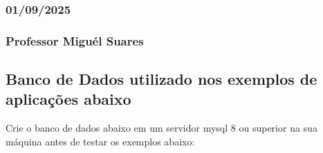 \documentclass[
]{book}
\begin{document}
\subsubsection*{01/09/2025}\label{section-12}

\subsubsection*{Professor Miguél Suares}\label{professor-miguuxe9l-suares-12}

\subsection{Banco de Dados utilizado nos exemplos de aplicações abaixo}\label{banco-de-dados-utilizado-nos-exemplos-de-aplicauxe7uxf5es-abaixo}

Crie o banco de dados abaixo em um servidor mysql 8 ou superior na sua máquina antes de testar os exemplos abaixo:
\end{document}
